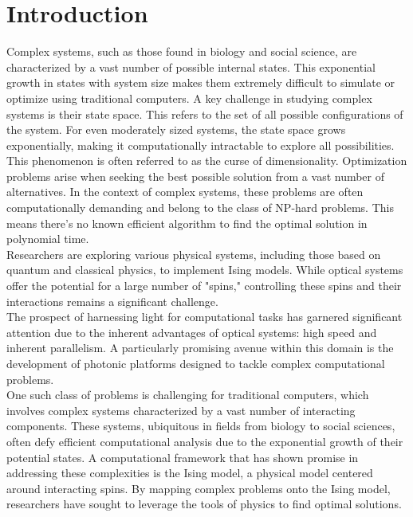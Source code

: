 \section{Introduction}
Complex systems, such as those found in biology and social science, are characterized by a vast number of possible internal states. This exponential growth in states with system size makes them extremely difficult to simulate or optimize using traditional computers. A key challenge in studying complex systems is their state space. This refers to the set of all possible configurations of the system. For even moderately sized systems, the state space grows exponentially, making it computationally intractable to explore all possibilities. This phenomenon is often referred to as the curse of dimensionality. Optimization problems arise when seeking the best possible solution from a vast number of alternatives. In the context of complex systems, these problems are often computationally demanding and belong to the class of NP-hard problems. This means there's no known efficient algorithm to find the optimal solution in polynomial time. \\

Researchers are exploring various physical systems, including those based on quantum and classical physics, to implement Ising models. While optical systems offer the potential for a large number of "spins," controlling these spins and their interactions remains a significant challenge. \\

The prospect of harnessing light for computational tasks has garnered significant attention due to the inherent advantages of optical systems: high speed and inherent parallelism. A particularly promising avenue within this domain is the development of photonic platforms designed to tackle complex computational problems.\\

One such class of problems is challenging for traditional computers, which involves complex systems characterized by a vast number of interacting components. These systems, ubiquitous in fields from biology to social sciences, often defy efficient computational analysis due to the exponential growth of their potential states. A computational framework that has shown promise in addressing these complexities is the Ising model, a physical model centered around interacting spins. By mapping complex problems onto the Ising model, researchers have sought to leverage the tools of physics to find optimal solutions.\\

